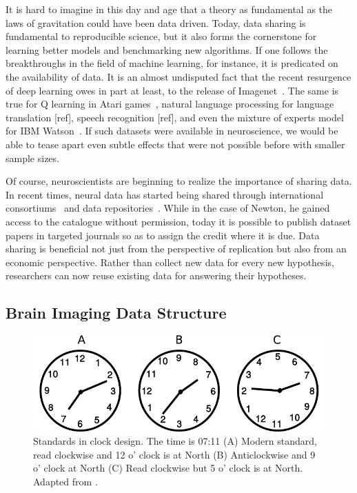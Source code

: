 It is hard to imagine in this day and age that a theory as fundamental as the laws of gravitation could have been data driven. Today, data sharing is fundamental to reproducible science, but it also forms the cornerstone for learning better models and benchmarking new algorithms. If one follows the breakthroughs in the field of machine learning, for instance, it is predicated on the availability of data. It is an almost undisputed fact that the recent resurgence of deep learning owes in part at least, to the release of Imagenet~\citep{deng2009imagenet}. The same is true for Q learning in Atari games~\citep{watkins1992q, bellemare2013arcade}, natural language processing for language translation [ref], speech recognition [ref], and even the mixture of experts model~\citep{jacobs1991adaptive} for IBM Watson~\citep{ferrucci2010building}. If such datasets were available in neuroscience, we would be able to tease apart even subtle effects that were not possible before with smaller sample sizes.

Of course, neuroscientists are beginning to realize the importance of sharing data. In recent times, neural data has started being shared through international consortiums~\citep{van2013wu, ollier2005uk} and data repositories~\citep{poldrack2013toward, gorgolewski2015neurovault}. While in the case of Newton, he gained access to the catalogue without permission, today it is possible to publish dataset papers in targeted journals so as to assign the credit where it is due.
Data sharing is beneficial not just from the perspective of replication but also from an economic perspective. Rather than collect new data for every new hypothesis, researchers can now reuse existing data for answering their hypotheses.

\subsection{Brain Imaging Data Structure}

\begin{figure}[htb]
\begin{center}
   \includegraphics[width=0.8\linewidth]{figures/clock.pdf}
\end{center}
   \caption[Standards in clocks]{Standards in clock design. The time is 07:11 (A) Modern standard, read clockwise and 12 o' clock is at North (B) Anticlockwise and 9 o' clock at North (C) Read clockwise but 5 o' clock is at North. Adapted from \cite{norman2013design}.}
   \label{fig:clock_standards}
\end{figure}

